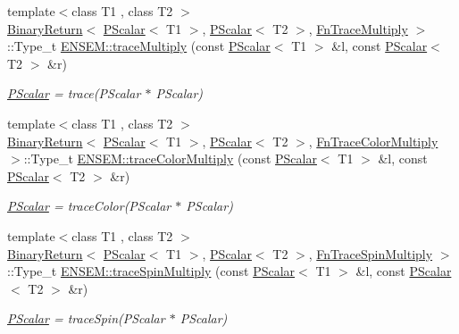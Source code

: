 \begin{DoxyCompactItemize}
{\footnotesize template$<$class T1 , class T2 $>$ }\\\mbox{\hyperlink{structENSEM_1_1BinaryReturn}{Binary\+Return}}$<$ \mbox{\hyperlink{classENSEM_1_1PScalar}{P\+Scalar}}$<$ T1 $>$, \mbox{\hyperlink{classENSEM_1_1PScalar}{P\+Scalar}}$<$ T2 $>$, \mbox{\hyperlink{structENSEM_1_1FnTraceMultiply}{Fn\+Trace\+Multiply}} $>$\+::Type\+\_\+t \mbox{\hyperlink{group__primscalar_gafbab702f52c534882636a524d002b106}{E\+N\+S\+E\+M\+::trace\+Multiply}} (const \mbox{\hyperlink{classENSEM_1_1PScalar}{P\+Scalar}}$<$ T1 $>$ \&l, const \mbox{\hyperlink{classENSEM_1_1PScalar}{P\+Scalar}}$<$ T2 $>$ \&r)
\begin{DoxyCompactList}\small\item\em \mbox{\hyperlink{classENSEM_1_1PScalar}{P\+Scalar}} = trace(\+P\+Scalar $\ast$ P\+Scalar) \end{DoxyCompactList}\item 
{\footnotesize template$<$class T1 , class T2 $>$ }\\\mbox{\hyperlink{structENSEM_1_1BinaryReturn}{Binary\+Return}}$<$ \mbox{\hyperlink{classENSEM_1_1PScalar}{P\+Scalar}}$<$ T1 $>$, \mbox{\hyperlink{classENSEM_1_1PScalar}{P\+Scalar}}$<$ T2 $>$, \mbox{\hyperlink{structENSEM_1_1FnTraceColorMultiply}{Fn\+Trace\+Color\+Multiply}} $>$\+::Type\+\_\+t \mbox{\hyperlink{group__primscalar_ga7d0ad8d52e28a6e277de161b427932eb}{E\+N\+S\+E\+M\+::trace\+Color\+Multiply}} (const \mbox{\hyperlink{classENSEM_1_1PScalar}{P\+Scalar}}$<$ T1 $>$ \&l, const \mbox{\hyperlink{classENSEM_1_1PScalar}{P\+Scalar}}$<$ T2 $>$ \&r)
\begin{DoxyCompactList}\small\item\em \mbox{\hyperlink{classENSEM_1_1PScalar}{P\+Scalar}} = trace\+Color(\+P\+Scalar $\ast$ P\+Scalar) \end{DoxyCompactList}\item 
{\footnotesize template$<$class T1 , class T2 $>$ }\\\mbox{\hyperlink{structENSEM_1_1BinaryReturn}{Binary\+Return}}$<$ \mbox{\hyperlink{classENSEM_1_1PScalar}{P\+Scalar}}$<$ T1 $>$, \mbox{\hyperlink{classENSEM_1_1PScalar}{P\+Scalar}}$<$ T2 $>$, \mbox{\hyperlink{structENSEM_1_1FnTraceSpinMultiply}{Fn\+Trace\+Spin\+Multiply}} $>$\+::Type\+\_\+t \mbox{\hyperlink{group__primscalar_gadf055daaaacb2711107a9c9dbba9a129}{E\+N\+S\+E\+M\+::trace\+Spin\+Multiply}} (const \mbox{\hyperlink{classENSEM_1_1PScalar}{P\+Scalar}}$<$ T1 $>$ \&l, const \mbox{\hyperlink{classENSEM_1_1PScalar}{P\+Scalar}}$<$ T2 $>$ \&r)
\begin{DoxyCompactList}\small\item\em \mbox{\hyperlink{classENSEM_1_1PScalar}{P\+Scalar}} = trace\+Spin(\+P\+Scalar $\ast$ P\+Scalar) \end{DoxyCompactList}\item 

\end{DoxyCompactItemize}
